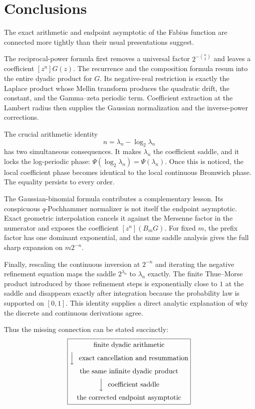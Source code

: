 \documentclass[11pt,oneside]{article}
\theoremstyle{definition}
\theoremstyle{remark}
\begin{document}
\section{Conclusions}
\label{dyadicasymbridge:sec:conclusions}

The exact arithmetic and endpoint asymptotic of the Fabius function are connected more tightly than their usual presentations suggest.

The reciprocal-power formula first removes a universal factor
$2^{-\binom n2}$ and leaves a coefficient $[z^n]G(z)$.  The recurrence and the composition formula resum into the entire dyadic product for $G$.  Its negative-real restriction is exactly the Laplace product whose Mellin transform produces the quadratic drift, the constant, and the Gamma--zeta periodic term.  Coefficient extraction at the Lambert radius then supplies the Gaussian normalization and the inverse-power corrections.

The crucial arithmetic identity
\[
 n=\lambda_n-\log_2\lambda_n
\]
has two simultaneous consequences.  It makes $\lambda_n$ the coefficient saddle, and it locks the log-periodic phase:
$\Psi(\log_2\lambda_n)=\Psi(\lambda_n)$.  Once this is noticed, the local coefficient phase becomes identical to the local continuous Bromwich phase.  The equality persists to every order.

The Gaussian-binomial formula contributes a complementary lesson.  Its conspicuous
$q$-Pochhammer normalizer is not itself the endpoint asymptotic.  Exact geometric interpolation cancels it against the Mersenne factor in the numerator and exposes the coefficient
$[z^n](B_mG)$.  For fixed $m$, the prefix factor has one dominant exponential, and the same saddle analysis gives the full sharp expansion on $m2^{-n}$.

Finally, rescaling the continuous inversion at $2^{-n}$ and iterating the negative refinement equation maps the saddle $2^{\lambda_n}$ to $\lambda_n$ exactly.  The finite Thue--Morse product introduced by those refinement steps is exponentially close to $1$ at the saddle and disappears exactly after integration because the probability law is supported on $[0,1]$.  This identity supplies a direct analytic explanation of why the discrete and continuous derivations agree.

Thus the missing connection can be stated succinctly:
\begin{equation*}
 \boxed{\begin{gathered}
 \text{finite dyadic arithmetic}\\
 \Big\downarrow\ \text{ exact cancellation and resummation}\\
 \text{the same infinite dyadic product}\\
 \Big\downarrow\ \text{ coefficient saddle}\\
 \text{the corrected endpoint asymptotic}
 \end{gathered}}
\end{equation*}
\end{document}
